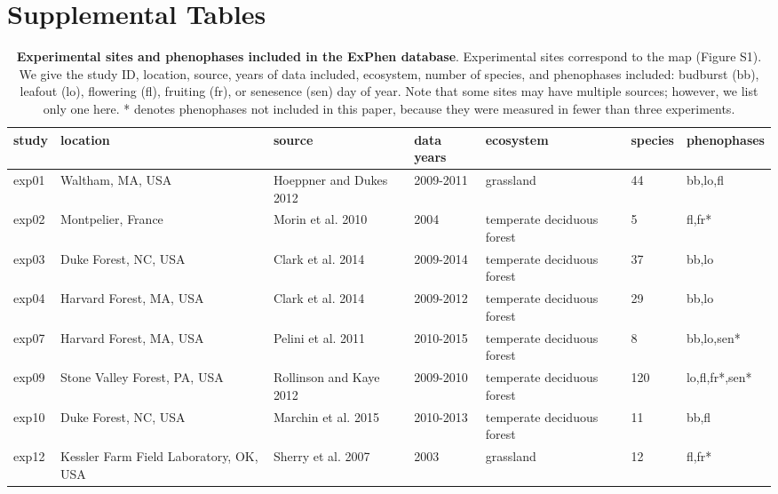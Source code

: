\documentclass{article}
\begin{document}
\clearpage
\section* {Supplemental Tables}

\begin{table}[ht]
\centering
\caption{\textbf{Experimental sites and phenophases included in the ExPhen database}. Experimental sites correspond to the map (Figure S1). We give the study ID, location, source, years of data included, ecosystem, number of species, and phenophases included: budburst (bb), leafout (lo), flowering (fl), fruiting (fr), or senesence (sen) day of year. Note that some sites may have multiple sources; however, we list only one here. * denotes phenophases not included in this paper, because they were measured in fewer than three experiments.} 
\label{tab:studylocs}
\begingroup\footnotesize
\begin{tabular}{|p{}|p{}|p{}|p{}|p{}|p{}|p{}|}
  \hline
study & location & source & data years & ecosystem & species & phenophases \\ 
  \hline
exp01 & Waltham, MA, USA & Hoeppner and Dukes 2012 & 2009-2011 & grassland & 44 & bb,lo,fl \\ 
   \hline
exp02 & Montpelier, France & Morin et al. 2010 & 2004 & temperate deciduous forest & 5 & fl,fr* \\ 
   \hline
exp03 & Duke Forest, NC, USA & Clark et al. 2014 & 2009-2014 & temperate deciduous forest & 37 & bb,lo \\ 
   \hline
exp04 & Harvard Forest, MA, USA & Clark et al. 2014 & 2009-2012 & temperate deciduous forest & 29 & bb,lo \\ 
   \hline
exp07 & Harvard Forest, MA, USA & Pelini et al. 2011 & 2010-2015 & temperate deciduous forest & 8 & bb,lo,sen* \\ 
   \hline
exp09 & Stone Valley Forest, PA, USA & Rollinson and Kaye 2012 & 2009-2010 & temperate deciduous forest & 120 & lo,fl,fr*,sen* \\ 
   \hline
exp10 & Duke Forest, NC, USA & Marchin et al. 2015 & 2010-2013 & temperate deciduous forest & 11 & bb,fl \\ 
   \hline
exp12 & Kessler Farm Field Laboratory, OK, USA & Sherry et al. 2007 & 2003 & grassland & 12 & fl,fr* \\ 
   \hline
\end{tabular}
\endgroup
\end{table}%
\end{document}
